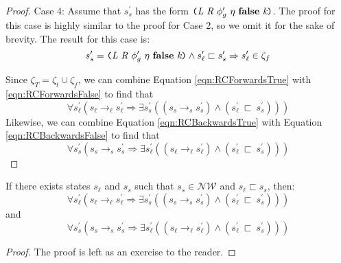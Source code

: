 \begin{proof}
Case 4: Assume that $s_s^\prime$ has the form $\lp \cfgnt{L}\ \cfgnt{R}\ \phi_g^\prime\ \eta\ \cfgt{false}\ \cfgnt{k}\rp $.
The proof for this case is highly similar to the proof for Case 2, so we omit it for the sake of brevity. The result for this case is:
\begin{equation}
\label{eqn:RCBackwardsFalse}
s_s^\prime=\lp \cfgnt{L}\ \cfgnt{R}\ \phi_g^\prime\ \eta\ \cfgt{false}\ \cfgnt{k}\rp \wedge s_\ell^\prime \sqsubset s_s^\prime \Rightarrow s_\ell^\prime \in \zeta_f
\end{equation}

Since $\zeta_T = \zeta_t \cup \zeta_f$, we can combine Equation \ref{eqn:RCForwardsTrue} with \ref{eqn:RCForwardsFalse} to find that 
\begin{equation}
\forall s_\ell^\prime ( s_\ell \rightarrow_\ell s_\ell^\prime \Rightarrow \exists s_s^\prime( (s_s \rightarrow_s s_s^\prime )\wedge (s_\ell^\prime\ \sqsubset\ s_s^\prime ))  )
\end{equation}
Likewise, we can combine Equation \ref{eqn:RCBackwardsTrue} with Equation \ref{eqn:RCBackwardsFalse} to find that
\begin{equation}
\forall s_s^\prime ( s_s \rightarrow_s s_s^\prime\Rightarrow \exists s_\ell^\prime( (s_\ell \rightarrow_\ell s_\ell^\prime )\wedge (s_\ell^\prime\ \sqsubset\ s_s^\prime ))  )
\end{equation}
\end{proof}

\begin{lemma}
\label{lem:new}
If there exists states $s_\ell$ and $s_s$ such that $s_s \in \mathcal{NW}$ and $s_\ell \sqsubset s_s$, then:
\begin{equation}
\forall s_\ell^\prime ( s_\ell \rightarrow_\ell s_\ell^\prime \Rightarrow \exists s_s^\prime( (s_s \rightarrow_s s_s^\prime )\wedge (s_\ell^\prime\ \sqsubset\ s_s^\prime ))  )
\end{equation}
and
\begin{equation}
\forall s_s^\prime ( s_s \rightarrow_s s_s^\prime\Rightarrow \exists s_\ell^\prime( (s_\ell \rightarrow_\ell s_\ell^\prime )\wedge (s_\ell^\prime\ \sqsubset\ s_s^\prime ))  )
\end{equation}

\begin{proof}
The proof is left as an exercise to the reader.
\end{proof}

\end{lemma}

